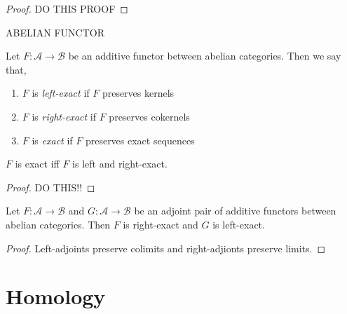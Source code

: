 \documentclass[12pt]{article}
\newcommand{\A}{\mathcal{A}}
\newcommand{\B}{\mathcal{B}}
\begin{document}
\begin{proof}
DO THIS PROOF
\end{proof}

\begin{definition}
ABELIAN FUNCTOR
\end{definition}

\begin{definition}
Let $F : \A \to \B$ be an additive functor between abelian categories. Then we say that,
\begin{enumerate}
\item $F$ is \textit{left-exact} if $F$ preserves kernels
\item $F$ is \textit{right-exact} if $F$ preserves cokernels
\item $F$ is \textit{exact} if $F$ preserves exact sequences
\end{enumerate}
\end{definition}

\begin{proposition}
$F$ is exact iff $F$ is left and right-exact. 
\end{proposition}

\begin{proof}
DO THIS!!
\end{proof}

\begin{proposition}
Let $F : \A \to \B$ and $G : \A \to \B$ be an adjoint pair of additive functors between abelian categories. Then $F$ is right-exact and $G$ is left-exact.
\end{proposition}

\begin{proof}
Left-adjoints preserve colimits and right-adjionts preserve limits.
\end{proof}

\section{Homology}
\end{document}
